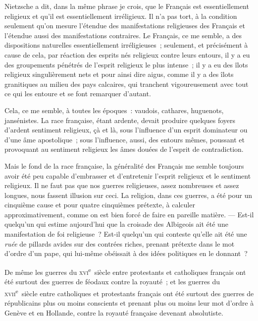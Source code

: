 \documentclass[french,twoside]{book} %
\begin{document}
\noindent Nietzsche a dit, dans la même phrase je crois, que le Français est essentiellement religieux et qu’il est essentiellement irréligieux. Il n’a pas tort, à la condition seulement qu’on mesure l’étendue des manifestations religieuses des Français et l’étendue aussi des manifestations contraires. Le Français, ce me semble, a des dispositions naturelles essentiellement irréligieuses ; seulement, et précisément à cause de cela, par réaction des esprits nés religieux contre leurs entours, il y a eu des groupements pénétrés de l’esprit religieux le plus intense ; il y a eu des îlots religieux singulièrement nets et pour ainsi dire aigus, comme il y a des îlots granitiques au milieu des pays calcaires, qui tranchent vigoureusement avec tout ce qui les entoure et se font remarquer d’autant.\par
Cela, ce me semble, à toutes les époques : vaudois, cathares, huguenots, jansénistes. La race française, étant ardente, devait produire quelques foyers d’ardent sentiment religieux, çà et là, sous l’influence d’un esprit dominateur ou d’une âme apostolique ; sous l’influence, aussi, des entours mêmes, poussant et provoquant au sentiment religieux les âmes douées de l’esprit de contradiction.\par
 Mais le fond de la race française, la généralité des Français me semble toujours avoir été peu capable d’embrasser et d’entretenir l’esprit religieux et le sentiment religieux. Il ne faut pas que nos guerres religieuses, assez nombreuses et assez longues, nous fassent illusion sur ceci. La religion, dans ces guerres, a été pour un cinquième cause et pour quatre cinquièmes prétexte, à calculer approximativement, comme on est bien forcé de faire en pareille matière. — Est-il quelqu’un qui estime aujourd’hui que la croisade des Albigeois ait été une manifestation de foi religieuse ? Est-il quelqu’un qui conteste qu’elle ait été une {\itshape ruée} de pillards avides sur des contrées riches, prenant prétexte dans le mot d’ordre d’un pape, qui lui-même obéissait à des idées politiques en le donnant ?\par
De même les guerres du \textsc{xvi}\textsuperscript{e} siècle entre protestants et catholiques français ont été surtout des guerres de féodaux contre la royauté ; et les guerres du \textsc{xvii}\textsuperscript{e} siècle entre catholiques et protestants français ont été surtout des guerres de républicains plus ou moins conscients et prenant plus ou moins leur mot d’ordre à Genève et en Hollande, contre la royauté française devenant absolutiste.\par
\end{document}
